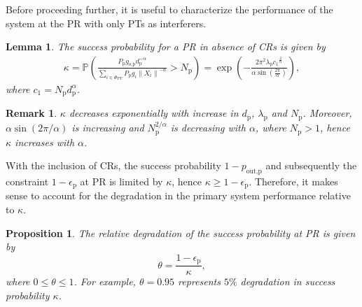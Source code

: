 \documentclass[conference, twocolumn]{IEEEtran}
\newcommand{\e}[2]{{\mathbb E}_{#1}\left[ #2 \right]}
\newcommand{\p}{\mathbb P}
\newcommand{\sub}[1]{_{\text{#1}}}
\newtheorem{lemma}{Lemma}
\newtheorem{prop}{Proposition}
\newtheorem{remark}{Remark}
\begin{document}
Before proceeding further, it is useful to characterize the performance of the system at the PR with only PTs as interferers. 
\begin{lemma}\label{lem:lemma1}
\normalfont
The success probability for a PR in absence of CRs is given by\cite[(3.29)]{Haenggi08now}
\begin{align}
\kappa = \p \left( \frac{P\sub{p} g\sub{$o$,p} d\sub{p}^{-\alpha}}{\sum\limits_{i \in \Phi_{\text{PT}}} P\sub{p} g_i {\|X_i\|}^{-\alpha}}  > N\sub{p} \right)  = \exp \left( - \frac{2 \pi^2 \lambda_{\text{p}}  {c_1}^\frac{2}{\alpha}}{\alpha \sin \left( \frac{2 \pi}{\alpha}\right)} \right), 
\label{eq:lem1}
\end{align}  
where $c_1 = N\sub{p} d\sub{p}^{\alpha}$. %
\end{lemma} 
\begin{remark} \label{rem:rem1}
\normalfont
$\kappa$ decreases exponentially with increase in $d\sub{p}$, $\lambda\sub{p}$ and $N\sub{p}$. Moreover, $\alpha \sin\left( 2 \pi/\alpha \right)$ is increasing and $N\sub{p}^{2/\alpha}$ is decreasing with $\alpha$, where $N\sub{p} > 1$, hence $\kappa$ increases with $\alpha$. 
\end{remark}

With the inclusion of CRs, the success probability $1 - p\sub{out,p}$ and subsequently the constraint $1 - \epsilon\sub{p} $ at PR is limited by $\kappa$, hence $\kappa \ge 1 - \epsilon\sub{p}$. Therefore, it makes sense to account for the degradation in the primary system performance relative to $\kappa$. 
\begin{prop} \label{prop:prop1}
\normalfont
The relative degradation of the success probability at PR is given by 
\begin{equation}
\theta = \frac{1 - \epsilon\sub{p}}{\kappa}, 
\label{eq:prop1}
\end{equation}
where $0 \le \theta \le 1$. For example, $\theta  = 0.95$ represents $5\%$ degradation in success probability $\kappa$. 
\end{prop}
\end{document}
